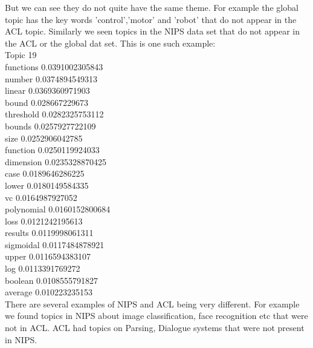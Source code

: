 \documentclass{article}
\begin{document}
{But we can see they do not quite have the same theme. For example the global topic has the key words 'control','motor'
and 'robot' that do not appear in the ACL topic.
Similarly we seen topics in the NIPS data set that do not appear in the ACL or the global dat set.
This is one such example:\\
Topic 19\\
functions 0.0391002305843\\
number 0.0374894549313\\
linear 0.0369360971903\\
bound 0.028667229673\\
threshold 0.0282325753112\\
bounds 0.0257927722109\\
size 0.0252906042785\\
function 0.0250119924033\\
dimension 0.0235328870425\\
case 0.0189646286225\\
lower 0.0180149584335\\
vc 0.0164987927052\\
polynomial 0.0160152800684\\
loss 0.0121242195613\\
results 0.0119998061311\\
sigmoidal 0.0117484878921\\
upper 0.0116594383107\\
log 0.0113391769272\\
boolean 0.0108555791827\\
average 0.010223235153\\

There are several examples of NIPS and ACL being very different. For example we found topics in NIPS about image classification,
face recognition etc that were not in ACL. ACL had topics on Parsing, Dialogue systems that were not present in NIPS.

}
\end{document}
